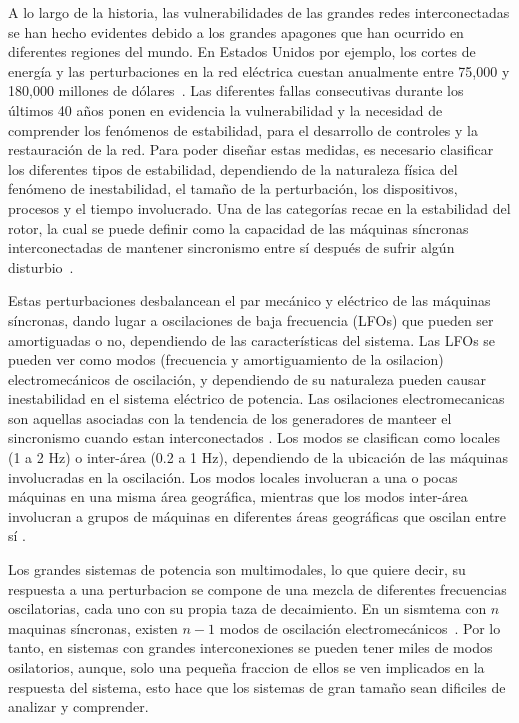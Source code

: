 A lo largo de la historia, las vulnerabilidades de las grandes redes interconectadas se han hecho 
evidentes debido a los grandes apagones que han ocurrido en diferentes regiones del mundo. En Estados 
Unidos por ejemplo, los cortes de energía y las perturbaciones en la red eléctrica cuestan anualmente 
entre 75,000 y 180,000 millones de dólares~\cite{Amin2008}. Las diferentes fallas consecutivas durante 
los últimos 40 años ponen en evidencia la vulnerabilidad y la necesidad de comprender los fenómenos de 
estabilidad, para el desarrollo de controles y la restauración de la red. Para poder diseñar estas 
medidas, es necesario clasificar los diferentes tipos de estabilidad, dependiendo de la naturaleza 
física del fenómeno de inestabilidad, el tamaño de la perturbación, los dispositivos, procesos y el 
tiempo involucrado. Una de las categorías recae en la estabilidad del rotor, la cual se puede definir 
como la capacidad de las máquinas síncronas interconectadas de mantener sincronismo entre sí después de 
sufrir algún disturbio~\cite{kundur1994, Kundur2004, Hatziargyriou2021}. 

Estas perturbaciones desbalancean el par mecánico y eléctrico de las máquinas síncronas, dando lugar a 
oscilaciones de baja frecuencia (LFOs) que pueden ser amortiguadas o no, dependiendo de las 
características del sistema. Las LFOs se pueden ver como modos (frecuencia y amortiguamiento de la 
osilacion) electromecánicos de oscilación, y dependiendo de su naturaleza pueden causar inestabilidad 
en el sistema eléctrico de potencia. Las osilaciones electromecanicas son aquellas asociadas con la tendencia
de los generadores de manteer el sincronismo cuando estan interconectados \cite{rogers2025}. Los modos se 
clasifican como locales (1 a 2 Hz) o inter-área (0.2 a 1 Hz), dependiendo de la ubicación de las máquinas involucradas en la oscilación. Los modos 
locales involucran a una o pocas máquinas en una misma área geográfica, mientras que los modos 
inter-área involucran a grupos de máquinas en diferentes áreas geográficas que oscilan entre sí \cite{rogers2025}. 

Los grandes sistemas de potencia son multimodales, lo que quiere decir, su respuesta a una perturbacion se compone
de una mezcla de diferentes frecuencias oscilatorias, cada uno con su propia taza de decaimiento. En un sismtema con
$n$ maquinas síncronas, existen $n-1$ modos de oscilación electromecánicos~\cite{rogers2025}. Por lo tanto, en sistemas con grandes 
interconexiones se pueden tener miles de modos osilatorios, aunque, solo una pequeña fraccion de ellos se ven
implicados en la respuesta del sistema, esto hace que los sistemas de gran tamaño sean dificiles de analizar y
comprender. 


